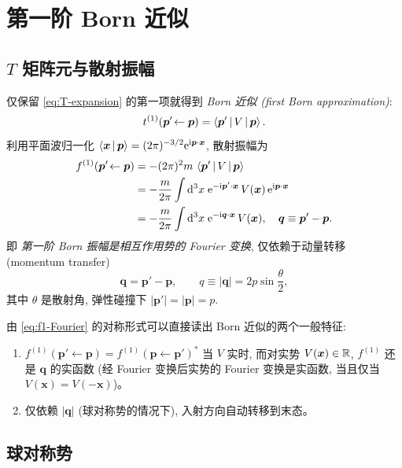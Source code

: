 \section{第一阶 Born 近似}\label{sec:first-born}

\subsection{$T$ 矩阵元与散射振幅}

仅保留 \eqref{eq:T-expansion} 的第一项就得到 \emph{Born 近似 (first Born approximation)}:
\begin{equation}
t^{(1)}(\bm p'\!\leftarrow\bm p)=\left\langle \bm p' \,\middle|\, V \,\middle|\, \bm p \right\rangle.
\label{eq:T1}
\end{equation}
利用平面波归一化 $\left\langle \bm x \,\middle|\, \bm p \right\rangle=(2\pi)^{-3/2}\mathrm{e}^{\mathrm{i}\bm p\cdot\bm x}$, 散射振幅为
\begin{align}
f^{(1)}(\bm p'\!\leftarrow\bm p)
&=-(2\pi)^{2}m\,\left\langle \bm p' \,\middle|\, V \,\middle|\, \bm p \right\rangle\notag\\
&=-\frac{m}{2\pi}\int\mathrm{d}^{3}x\;\mathrm{e}^{-\mathrm{i}\bm p'\cdot\bm x}\,V(\bm x)\,\mathrm{e}^{\mathrm{i}\bm p\cdot\bm x}\notag\\
&=-\frac{m}{2\pi}\int\mathrm{d}^{3}x\;\mathrm{e}^{-\mathrm{i}\bm q\cdot\bm x}\,V(\bm x),
\quad \bm q\equiv\bm p'-\bm p.
\label{eq:f1-Fourier}
\end{align}
即 \emph{第一阶 Born 振幅是相互作用势的 Fourier 变换}, 仅依赖于动量转移 (momentum transfer)
\begin{equation}
\bm q=\bm p'-\bm p,\qquad q\equiv|\bm q|=2p\sin\frac{\theta}{2},
\end{equation}
其中 $\theta$ 是散射角, 弹性碰撞下 $|\bm p'|=|\bm p|=p$.

\begin{remark}
由 \eqref{eq:f1-Fourier} 的对称形式可以直接读出 Born 近似的两个一般特征:
\begin{enumerate}
  \item $f^{(1)}(\bm p'\!\leftarrow\bm p)=f^{(1)}(\bm p\!\leftarrow\bm p')^{*}$ 当 $V$ 实时, 而对实势 $V(\bm x)\in\mathbb{R}$, $f^{(1)}$ 还是 $\bm q$ 的实函数 (经 Fourier 变换后实势的 Fourier 变换是实函数, 当且仅当 $V(\bm x)=V(-\bm x)$)。
  \item 仅依赖 $|\bm q|$ (球对称势的情况下), 入射方向自动转移到末态。
\end{enumerate}
\end{remark}

\subsection{球对称势}

